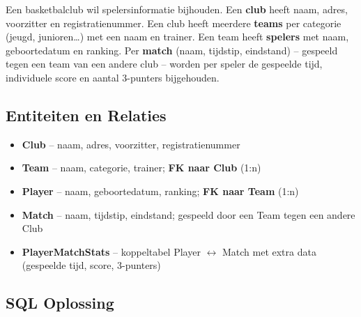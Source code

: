 \documentclass[a4paper,11pt]{article}
\begin{document}
\begin{oefening}[Basketbalclub]
Een basketbalclub wil spelersinformatie bijhouden. Een \textbf{club} heeft naam, adres, voorzitter en registratienummer. Een club heeft meerdere \textbf{teams} per categorie (jeugd, junioren\ldots) met een naam en trainer. Een team heeft \textbf{spelers} met naam, geboortedatum en ranking. Per \textbf{match} (naam, tijdstip, eindstand) -- gespeeld tegen een team van een andere club -- worden per speler de gespeelde tijd, individuele score en aantal 3-punters bijgehouden.
\end{oefening}

\subsection{Entiteiten en Relaties}

\begin{itemize}
  \item \textbf{Club} -- naam, adres, voorzitter, registratienummer
  \item \textbf{Team} -- naam, categorie, trainer; \textbf{FK naar Club} (1:n)
  \item \textbf{Player} -- naam, geboortedatum, ranking; \textbf{FK naar Team} (1:n)
  \item \textbf{Match} -- naam, tijdstip, eindstand; gespeeld door een Team tegen een andere Club
  \item \textbf{PlayerMatchStats} -- koppeltabel Player $\leftrightarrow$ Match met extra data (gespeelde tijd, score, 3-punters)
\end{itemize}

\subsection{SQL Oplossing}
\end{document}

